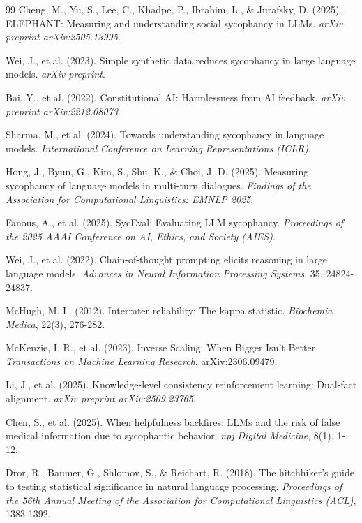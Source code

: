 \documentclass[sigconf,screen]{acmart}
\begin{document}
\begin{thebibliography}{99}
 Cheng, M., Yu, S., Lee, C., Khadpe, P., Ibrahim, L., \& Jurafsky, D. (2025). ELEPHANT: Measuring and understanding social sycophancy in LLMs. \textit{arXiv preprint arXiv:2505.13995}.

 Wei, J., et al. (2023). Simple synthetic data reduces sycophancy in large language models. \textit{arXiv preprint}.

 Bai, Y., et al. (2022). Constitutional AI: Harmlessness from AI feedback. \textit{arXiv preprint arXiv:2212.08073}.

 Sharma, M., et al. (2024). Towards understanding sycophancy in language models. \textit{International Conference on Learning Representations (ICLR)}.

 Hong, J., Byun, G., Kim, S., Shu, K., \& Choi, J. D. (2025). Measuring sycophancy of language models in multi-turn dialogues. \textit{Findings of the Association for Computational Linguistics: EMNLP 2025}.

 Fanous, A., et al. (2025). SycEval: Evaluating LLM sycophancy. \textit{Proceedings of the 2025 AAAI Conference on AI, Ethics, and Society (AIES)}.

 Wei, J., et al. (2022). Chain-of-thought prompting elicits reasoning in large language models. \textit{Advances in Neural Information Processing Systems}, 35, 24824-24837.

 McHugh, M. L. (2012). Interrater reliability: The kappa statistic. \textit{Biochemia Medica}, 22(3), 276-282.

 McKenzie, I. R., et al. (2023). Inverse Scaling: When Bigger Isn't Better. \textit{Transactions on Machine Learning Research}. arXiv:2306.09479.

 Li, J., et al. (2025). Knowledge-level consistency reinforcement learning: Dual-fact alignment. \textit{arXiv preprint arXiv:2509.23765}.

 Chen, S., et al. (2025). When helpfulness backfires: LLMs and the risk of false medical information due to sycophantic behavior. \textit{npj Digital Medicine}, 8(1), 1-12.

 Dror, R., Baumer, G., Shlomov, S., \& Reichart, R. (2018). The hitchhiker's guide to testing statistical significance in natural language processing. \textit{Proceedings of the 56th Annual Meeting of the Association for Computational Linguistics (ACL)}, 1383-1392.


\end{thebibliography}
\end{document}

